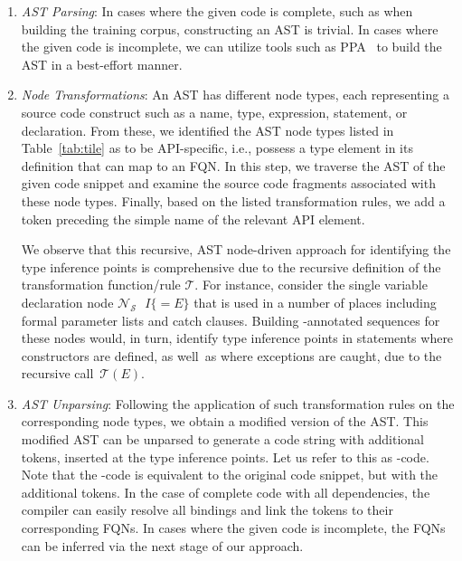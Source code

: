 \begin{enumerate}
    \item \textit{AST Parsing}: In cases where the given code is complete, such as when building the training corpus, constructing an AST is trivial. In cases where the given code is incomplete, we can utilize tools such as PPA~\cite{dagenais-oopsla08} to build the AST in a best-effort manner. 

    \item \textit{Node Transformations}: An AST has different node types, each representing a source code construct such as a name, type, expression, statement, or declaration. From these, we identified the AST node types listed in Table~\ref{tab:tile} as to be API-specific, i.e., possess a type element in its definition that can map to an FQN. In this step, we traverse the AST of the given code snippet and examine the source code fragments associated with these node types. Finally, based on the listed transformation rules, we add a \blank token preceding the simple name of the relevant API element. 

    \vspace{2pt}
    \par We observe that this recursive, AST node-driven approach for identifying the type inference points is comprehensive due to the recursive definition of the transformation function/rule $\mathcal{T}$. For instance, consider the single variable declaration node $\mathcal{N}_\mathcal{S}\text{ }I \{=E\}$ that is used in a number of places including formal parameter lists and catch clauses. Building \blank-annotated sequences for these nodes would, in turn, identify type inference points in statements where constructors are defined, as well~as where exceptions are caught, due to the recursive call~$\mathcal{T}(E)$.

    \item \textit{AST Unparsing}: 
    Following the application of 
    such
    transformation rules on the corresponding node types,
    we obtain a modified version of the AST. This modified AST can be unparsed to generate a code string with additional \blank tokens, inserted at the type inference points. Let us refer to this as \blank-code.
    Note that the \blank-code is equivalent to the original code snippet, but with the additional \blank tokens.
    In the case of complete code with all dependencies, the compiler can easily resolve all bindings and link the \blank tokens to their corresponding FQNs. In cases where the given code is incomplete, the FQNs can be inferred via the next stage of our approach.
\end{enumerate}  

